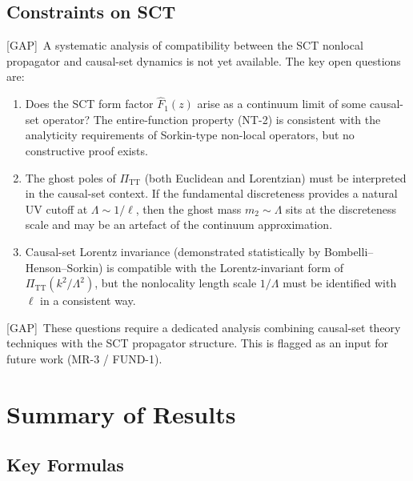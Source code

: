 \documentclass[11pt,a4paper]{article}
\theoremstyle{definition}
\theoremstyle{remark}
\newcommand{\gap}{\textcolor{red!80!black}{\textsf{[GAP]}}}
\begin{document}
\subsection{Constraints on SCT}

\gap\ A systematic analysis of compatibility between the SCT nonlocal
propagator and causal-set dynamics is not yet available.  The key
open questions are:

\begin{enumerate}
  \item Does the SCT form factor $\hat{F}_1(z)$ arise as a continuum
    limit of some causal-set operator?  The entire-function property
    (NT-2) is consistent with the analyticity requirements of
    Sorkin-type non-local operators, but no constructive proof exists.
  \item The ghost poles of $\Pi_{\mathrm{TT}}$ (both Euclidean and
    Lorentzian) must be interpreted in the causal-set context.  If the
    fundamental discreteness provides a natural UV cutoff at
    $\Lambda \sim 1/\ell$, then the ghost mass $m_2 \sim \Lambda$
    sits at the discreteness scale and may be an artefact of the
    continuum approximation.
  \item Causal-set Lorentz invariance (demonstrated statistically by
    Bombelli--Henson--Sorkin) is compatible with the Lorentz-invariant
    form of $\Pi_{\mathrm{TT}}(k^2/\Lambda^2)$, but the nonlocality
    length scale $1/\Lambda$ must be identified with $\ell$ in a
    consistent way.
\end{enumerate}

\gap\ These questions require a dedicated analysis combining causal-set
theory techniques with the SCT propagator structure.  This is flagged
as an input for future work (MR-3 / FUND-1).


\section{Summary of Results}
\label{sec:summary}

\subsection{Key Formulas}
\end{document}
